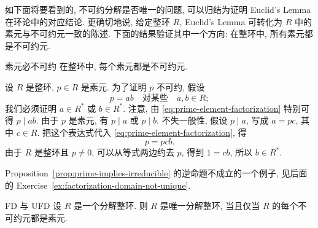 如下面将要看到的, 不可约分解是否唯一的问题, 可以归结为证明 Euclid's Lemma 在环论中的对应结论. 更确切地说, 给定整环 $R$, Euclid's Lemma 可转化为 $R$ 中的素元与不可约元一致的陈述. 下面的结果验证其中一个方向: 在整环中, 所有素元都是不可约元.

\begin{Proposition}{素元必不可约}\label{prop:prime-implies-irreducible}
  在整环中, 每个素元都是不可约元.
\end{Proposition}

\begin{Proof}
  设 $R$ 是整环, $p\in R$ 是素元. 为了证明 $p$ 不可约, 假设
  \begin{equation}\label{eq:prime-element-factorization}
    p=ab\quad\text{对某些}\quad a,b\in R;
  \end{equation}
  我们必须证明 $a\in R^{*}$ 或 $b\in R^{*}$. 注意, 由 \eqref{eq:prime-element-factorization} 特别可得 $p\mid ab$. 由于 $p$ 是素元, 有 $p\mid a$ 或 $p\mid b$. 不失一般性, 假设 $p\mid a$, 写成 $a=pc$, 其中 $c\in R$. 把这个表达式代入 \eqref{eq:prime-element-factorization}, 得
  \[
    p=pcb.
  \]
  由于 $R$ 是整环且 $p\ne0$, 可以从等式两边约去 $p$, 得到 $1=cb$, 所以 $b\in R^{*}$.
\end{Proof}

%
  {Proposition~\ref{prop:prime-implies-irreducible} 的逆命题不成立的一个例子, 见后面的 Exercise~\ref{ex:factorization-domain-not-unique}.}

\begin{Proposition}{FD 与 UFD}\label{prop:ufd-iff-irreducibles-prime}
  设 $R$ 是一个分解整环. 则 $R$ 是唯一分解整环, 当且仅当 $R$ 的每个不可约元都是素元.
\end{Proposition}

